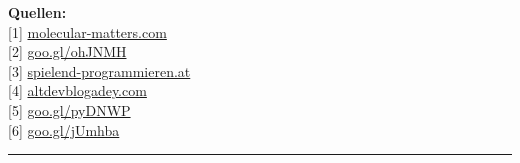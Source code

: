 \documentclass[10pt,a4paper,ngerman,twoside]{article} %
\newcommand{\SepRule}{\noindent	%
\begin{center}
\rule{250pt}{1pt} %
\end{center}
}
\begin{document}
\begin{multicols}{3}
\textbf{Quellen:} \\
{[}1{]} \href{http://www.molecular-matters.com}{molecular-matters.com} \\
{[}2{]} \href{http://www.altdevblogaday.com/2011/09/27/how-the-austrian-guy-ended-up-working-in-the-games-industry/}{goo.gl/ohJNMH} \\
{[}3{]} \href{http://spielend-programmieren.at}{spielend-programmieren.at} \\
{[}4{]} \href{http://www.altdevblogaday.com/}{altdevblogadey.com} \\
{[}5{]} \href{https://commons.wikimedia.org/wiki/File:Commodore64.jpg}{goo.gl/pyDNWP} \\
{[}6{]} \href{http://www.cg.tuwien.ac.at/courses/CG23/HallOfFame/2004/}{goo.gl/jUmhba} \\










 

\end{multicols}
\SepRule
\end{document}
